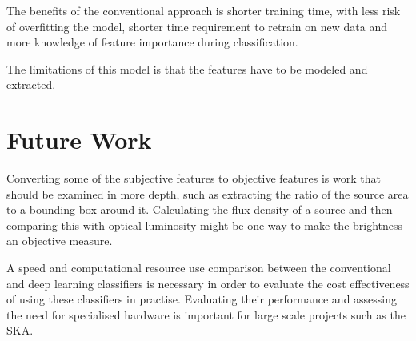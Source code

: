 \documentclass[conference]{IEEEtran}
\begin{document}
The benefits of the conventional approach is shorter training time, with less risk of overfitting the model, shorter time requirement to retrain on new data and more knowledge of feature importance during classification.

The limitations of this model is that the features have to be modeled and extracted.

\section{Future Work}

Converting some of the subjective features to objective features is work that should be examined in more depth, such as extracting the ratio of the source area to a bounding box around it. Calculating the flux density of a source and then comparing this with optical luminosity might be one way to make the brightness an objective measure.

A speed and computational resource use comparison between the conventional and deep learning classifiers is necessary in order to evaluate the cost effectiveness of using these classifiers in practise. Evaluating their performance and assessing the need for specialised hardware is important for large scale projects such as the SKA.







\end{document}
